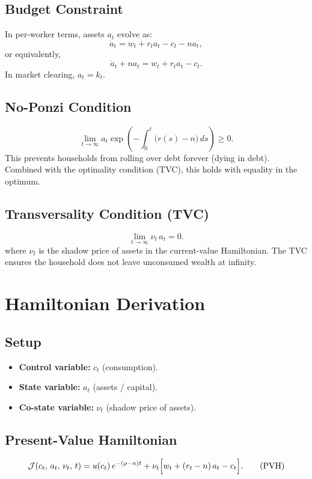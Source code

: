 \documentclass[a4paper,11pt]{article}
\begin{document}
\subsection*{Budget Constraint}
In per-worker terms, assets $a_t$ evolve as:
\[
  \dot{a}_t = w_t + r_t a_t - c_t - n a_t,
\]
or equivalently,
\[
  \dot{a}_t + n a_t = w_t + r_t a_t - c_t. \tag{BC}
\]
In market clearing, $a_t = k_t$.

\subsection*{No-Ponzi Condition}
\[
  \lim_{t \to \infty} a_t \exp\!\left(-\int_0^t \bigl(r(s) - n\bigr)\, ds\right) \geq 0. \tag{NPC}
\]
This prevents households from rolling over debt forever (dying in debt). Combined with the optimality condition (TVC), this holds with equality in the optimum.

\subsection*{Transversality Condition (TVC)}
\[
  \lim_{t \to \infty} \nu_t \, a_t = 0. \tag{TVC}
\]
where $\nu_t$ is the shadow price of assets in the current-value Hamiltonian. The TVC ensures the household does not leave unconsumed wealth at infinity.

\section{Hamiltonian Derivation}

\subsection*{Setup}
\begin{itemize}[leftmargin=*]
  \item \textbf{Control variable:} $c_t$ (consumption).
  \item \textbf{State variable:} $a_t$ (assets / capital).
  \item \textbf{Co-state variable:} $\nu_t$ (shadow price of assets).
\end{itemize}

\subsection*{Present-Value Hamiltonian}
\[
  \mathcal{J}(c_t,\, a_t,\, \nu_t,\, t)
  = u(c_t)\, e^{-(\rho - n)t}
    + \nu_t \Bigl[w_t + (r_t - n)\, a_t - c_t\Bigr]. \tag{PVH}
\]
\end{document}
